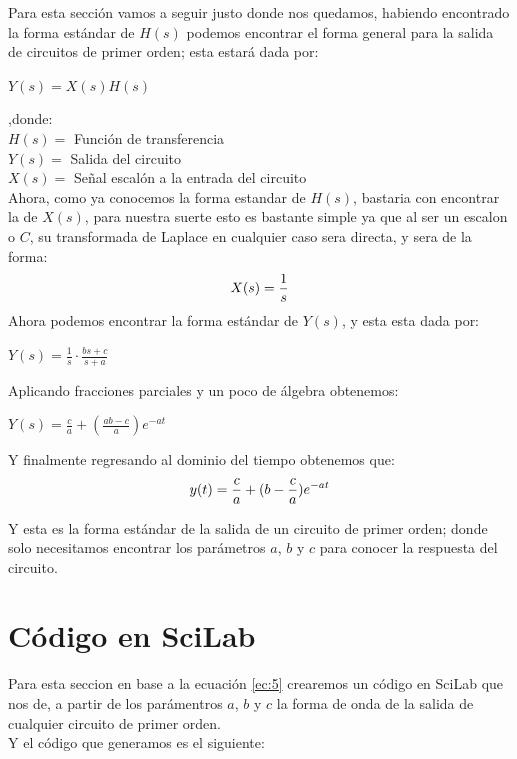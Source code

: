 \documentclass[letterpaper,spanish,12pt]{report}
\begin{document}
Para esta secci\'on vamos a seguir justo donde nos quedamos, habiendo encontrado la forma est\'andar de $H(s)$ podemos encontrar el forma general para la salida de circuitos de primer orden; esta estar\'a dada por:
	\begin{center} $Y(s) = X(s) H(s)$ \end{center}
,donde:\medskip \\
	$H(s) =$ Funci\'on de transferencia\medskip \\
	$Y(s) =$ Salida del circuito\medskip \\
	$X(s) =$ Se\~nal escal\'on a la entrada del circuito\medskip \\
Ahora, como ya conocemos la forma estandar de $H(s)$, bastaria con encontrar la de $X(s)$, para nuestra suerte esto es bastante simple ya que al ser un escalon o $C$, su transformada de Laplace en cualquier caso sera directa, y sera de la forma:
	\begin{equation}
		\centering
			X(s) = \frac {1} {s}
		\label{ec:4}
	\end{equation}
Ahora podemos encontrar la forma est\'andar de $Y(s)$, y esta esta dada por:
	\begin{center} $Y(s) = \frac {1} {s} \cdot \frac {bs + c} {s + a}$ \end{center}
Aplicando fracciones parciales y un poco de \'algebra obtenemos:
	\begin{center} $Y(s) = \frac {c} {a} + (\frac {ab - c} {a}) e^{-at}$ \end{center}
Y finalmente regresando al dominio del tiempo obtenemos que:
	\begin{equation}
		\centering
			y(t) = \frac {c} {a} + (b - \frac {c} {a})e^{-at}
		\label{ec:5}
	\end{equation}

Y esta es la forma est\'andar de la salida de un circuito de primer orden; donde solo necesitamos encontrar los par\'ametros $a$, $b$ y $c$ para conocer la respuesta del circuito.

	\section{C\'odigo en SciLab} \label{sec:1}

Para esta seccion en base a la ecuaci\'on \ref{ec:5} crearemos un c\'odigo en SciLab que nos de, a partir de los par\'amentros $a$, $b$ y $c$ la forma de onda de la salida de cualquier circuito de primer orden. \medskip \\ Y el c\'odigo que generamos es el siguiente:
\end{document}
